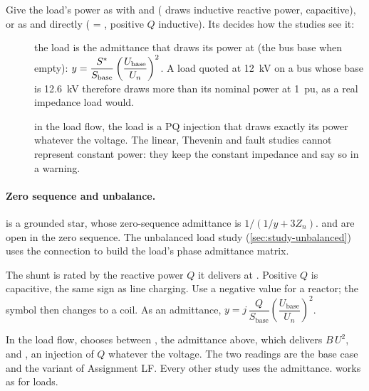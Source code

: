 


Give the load's power as  with  and  (
draws inductive reactive power,  capacitive), or as  and 
directly ( = , positive $Q$ inductive). Its  decides
how the studies see it:

\begin{description}
  \item[] the load is the admittance that draws its power at
     (the bus base when empty):
    $y = \dfrac{{S}^{*}}{S_\text{base}}\left(\dfrac{U_\text{base}}{U_n}\right)^2$.
    A load quoted at 12~kV on a bus whose base is 12.6~kV therefore draws more than its
    nominal power at 1~pu, as a real impedance load would.
  \item[] in the load flow, the load is a PQ injection that draws
    exactly its power whatever the voltage. The linear, Thevenin and fault studies cannot
    represent constant power: they keep the constant impedance and say so in a warning.
\end{description}

\paragraph{Zero sequence and unbalance.}   is a grounded star,
whose zero-sequence admittance is $1/(1/y + 3Z_n)$.  and  are open in the
zero sequence. The unbalanced load study (\cref{sec:study-unbalanced}) uses the connection
to build the load's phase admittance matrix.




The shunt is rated by the reactive power $Q$ it delivers at . Positive $Q$
is capacitive, the same sign as line charging. Use a negative value for a reactor; the
symbol then changes to a coil. As an admittance,
$y = j\,\dfrac{Q}{S_\text{base}}\left(\dfrac{U_\text{base}}{U_n}\right)^2$.

In the load flow,  chooses between , the admittance above,
which delivers $B\,U^2$, and , an injection of $Q$ whatever the voltage.
The two readings are the base case and the variant of Assignment LF. Every other study
uses the admittance.  works as for loads.

